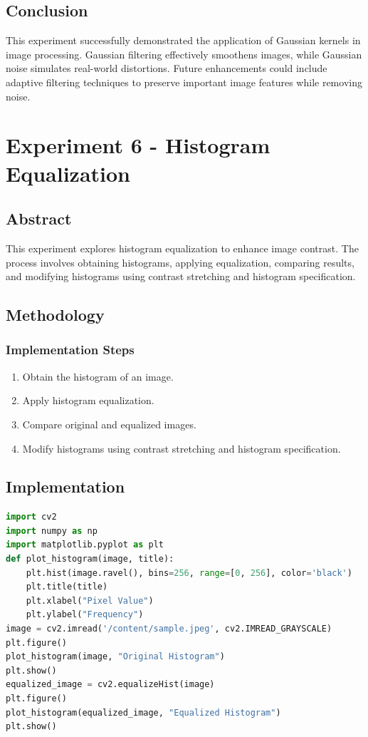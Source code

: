\documentclass{report}
\begin{document}
\section{Conclusion}
This experiment successfully demonstrated the application of Gaussian kernels in image processing. Gaussian filtering effectively smoothens images, while Gaussian noise simulates real-world distortions. Future enhancements could include adaptive filtering techniques to preserve important image features while removing noise.

\chapter{Experiment 6 - Histogram Equalization}

\section{Abstract}
This experiment explores histogram equalization to enhance image contrast. The process involves obtaining histograms, applying equalization, comparing results, and modifying histograms using contrast stretching and histogram specification.

\section{Methodology}
\subsection{Implementation Steps}
\begin{enumerate}
    \item Obtain the histogram of an image.
    \item Apply histogram equalization.
    \item Compare original and equalized images.
    \item Modify histograms using contrast stretching and histogram specification.
\end{enumerate}
\section{Implementation}
\begin{lstlisting}[language=Python, caption=Histogram Equalization, label=code:histogram-equalization]
import cv2
import numpy as np
import matplotlib.pyplot as plt
def plot_histogram(image, title):
    plt.hist(image.ravel(), bins=256, range=[0, 256], color='black')
    plt.title(title)
    plt.xlabel("Pixel Value")
    plt.ylabel("Frequency")
image = cv2.imread('/content/sample.jpeg', cv2.IMREAD_GRAYSCALE)
plt.figure()
plot_histogram(image, "Original Histogram")
plt.show()
equalized_image = cv2.equalizeHist(image)
plt.figure()
plot_histogram(equalized_image, "Equalized Histogram")
plt.show()
\end{lstlisting}
\end{document}
